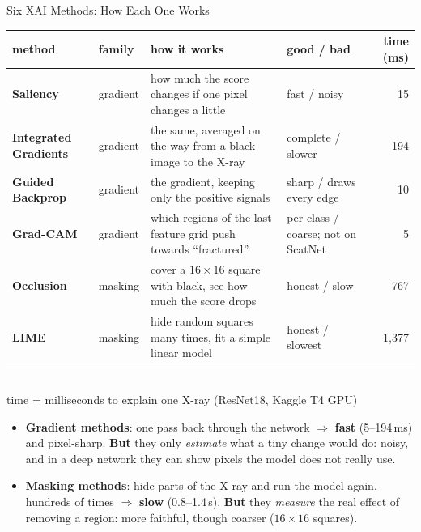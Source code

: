 \documentclass[aspectratio=169,10pt]{beamer}
\begin{document}
\begin{frame}{Six XAI Methods: How Each One Works}
  \vspace{0.3em}
  \centering\scriptsize
  \renewcommand{\arraystretch}{1.05}\setlength{\tabcolsep}{4pt}
  \begin{tabular}{>{\raggedright\arraybackslash\bfseries}p{2.5cm}>{\raggedright\arraybackslash}p{1.1cm}>{\raggedright\arraybackslash}p{5.3cm}>{\raggedright\arraybackslash}p{2.7cm}r}
    \toprule
    \textbf{method} & \textbf{family} & \textbf{how it works} & \textbf{good / bad} & \textbf{time (ms)} \\
    \midrule
    Saliency & gradient & how much the score changes if one pixel changes a little & fast / noisy & 15 \\
    Integrated Gradients & gradient & the same, averaged on the way from a black image to the X-ray & complete / slower & 194 \\
    Guided Backprop & gradient & the gradient, keeping only the positive signals & sharp / draws every edge & 10 \\
    Grad-CAM & gradient & which regions of the last feature grid push towards ``fractured'' & per class / coarse; not on ScatNet & 5 \\
    \midrule
    Occlusion & masking & cover a $16{\times}16$ square with black, see how much the score drops & honest / slow & 767 \\
    LIME & masking & hide random squares many times, fit a simple linear model & honest / slowest & 1,377 \\
    \bottomrule
  \end{tabular}\\[0.2em]
  \scriptsize time = milliseconds to explain one X-ray (ResNet18, Kaggle T4 GPU)
  \vspace{0.4em}

  \raggedright\footnotesize
  \begin{itemize}
    \item \textbf{Gradient methods}: one pass back through the network $\Rightarrow$ \textbf{fast} \mbox{(5--194\,ms)} and
          pixel-sharp. \textbf{But} they only \emph{estimate} what a tiny change would do: noisy, and in a deep network
          they can show pixels the model does not really use.
    \item \textbf{Masking methods}: hide parts of the X-ray and run the model again, hundreds of times $\Rightarrow$
          \textbf{slow} \mbox{(0.8--1.4\,s)}. \textbf{But} they \emph{measure} the real effect of removing a region: more
          faithful, though coarser ($16{\times}16$ squares).
  \end{itemize}
\end{frame}
\end{document}
